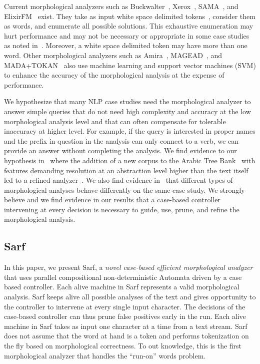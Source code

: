 \documentclass[11pt,letterpaper]{article}
\begin{document}
Current morphological analyzers such as 
Buckwalter~,
Xerox~\cite{Beesley:01}, SAMA~\cite{Kulick:10},
and ElixirFM~\cite{Otakar:07} exist.
They take as input white space delimited tokens~\cite{Kulick:10},
consider them as words,
and enumerate all possible solutions. 
This exhaustive enumeration may hurt performance and may
not be necessary or appropriate
in some case studies as noted in~\cite{Maamouri:10}. 
Moreover, a white space delimited token may have 
more than one word.
Other morphological analyzers such as Amira~\cite{Diab:07,Benajiba:07},
MAGEAD~\cite{Habash:05}, and MADA+TOKAN~\cite{Habash:09} 
also use machine learning and support vector machines (SVM) 
to enhance the accuracy of the morphological analysis at the expense 
of performance.

We hypothesize that many NLP case studies need the 
morphological analyzer to answer simple queries that do not need 
high complexity and accuracy at the low morphological analysis level 
and that can often compensate for tolerable inaccuracy at higher level. 
For example, if the query is interested in proper names and the 
prefix in question in the analysis can only connect to a verb, 
we can provide an answer without completing the analysis. 
We find evidence to our hypothesis in~\cite{Maamouri:10} where the 
addition of a new corpus to the Arabic Tree Bank~\cite{Maamouri:04}
with features demanding resolution at an abstraction level
higher than the text itself
led to a refined analyzer~\cite{Kulick:10}.  
We also find evidence in~\cite{Habash:06} that different types of 
morphological analyses behave differently on the same case study. 
We strongly believe and we find evidence in our results that a 
case-based controller intervening at every decision is necessary to 
guide, use, prune, and refine the morphological analysis.

\subsection{Sarf}
\label{sec:intro:sarf}

In this paper, we present Sarf, a {\em novel case-based efficient
morphological analyzer} that uses parallel compositional 
non-deterministic Automata driven by a case based controller.
Each alive machine in Sarf represents a valid morphological analysis. 
Sarf keeps alive all possible analyses of the text and gives 
opportunity to the controller to intervene at every single input 
character. 
The decisions of the case-based controller can thus prune false 
positives early in the run. 
Each alive machine in Sarf takes as input one character at a time 
from a text stream. 
Sarf does not assume that the word at hand is a token and
performs tokenization on the fly based on morphological correctness.
To out knowledge, this is the first morphological analyzer that 
handles the ``run-on'' words problem. 
\end{document}
